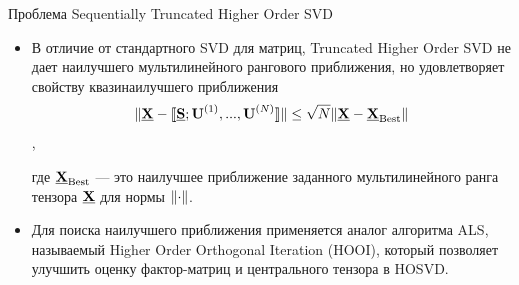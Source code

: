 \begin{frame}{Проблема Sequentially Truncated Higher Order SVD}
\begin{itemize}
    \item В отличие от стандартного SVD для матриц, Truncated Higher Order SVD не дает наилучшего мультилинейного рангового приближения, но удовлетворяет свойству квазинаилучшего приближения
$$
\lVert  \underline{\textbf{X}} - \llbracket \underline{\textbf{S}};\textbf{U}^{(1)},...,\textbf{U}^{(N)} \rrbracket \rVert \leq \sqrt{N}\lVert \underline{\textbf{X}} - \underline{\textbf{X}}_{\text{Best}} \rVert
$$,

где $\underline{\textbf{X}}_{\text{Best}}$ --- это наилучшее приближение заданного мультилинейного ранга тензора $\underline{\textbf{X}}$ для  нормы $\lVert \cdot \rVert$.

\item Для поиска наилучшего приближения применяется аналог алгоритма ALS, называемый Higher Order Orthogonal Iteration (HOOI), который позволяет улучшить оценку фактор-матриц и центрального тензора в HOSVD.

\end{itemize}

\end{frame}


